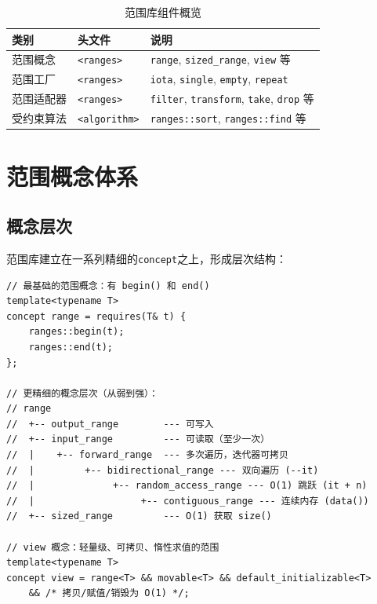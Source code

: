 \documentclass[12pt,a4paper,fontset=fandol]{ctexbook}
\newcommand{\header}[1]{\texttt{<#1>}}
\begin{document}
\begin{table}[htbp]
\centering
\caption{范围库组件概览}
\begin{tabularx}{\textwidth}{l l >{\raggedright\arraybackslash}X}
\toprule
\textbf{类别} & \textbf{头文件} & \textbf{说明} \\
\midrule
范围概念   & \header{ranges}       & \texttt{range}, \texttt{sized\_range}, \texttt{view} 等 \\
范围工厂   & \header{ranges}       & \texttt{iota}, \texttt{single}, \texttt{empty}, \texttt{repeat} \\
范围适配器 & \header{ranges}       & \texttt{filter}, \texttt{transform}, \texttt{take}, \texttt{drop} 等 \\
受约束算法 & \header{algorithm}    & \texttt{ranges::sort}, \texttt{ranges::find} 等 \\
\bottomrule
\end{tabularx}
\end{table}

\chapter{范围概念体系}

\section{概念层次}

范围库建立在一系列精细的\texttt{concept}之上，形成层次结构：

\begin{lstlisting}
// 最基础的范围概念：有 begin() 和 end()
template<typename T>
concept range = requires(T& t) {
    ranges::begin(t);
    ranges::end(t);
};

// 更精细的概念层次（从弱到强）：
// range
//  +-- output_range        --- 可写入
//  +-- input_range         --- 可读取（至少一次）
//  |    +-- forward_range  --- 多次遍历，迭代器可拷贝
//  |         +-- bidirectional_range --- 双向遍历 (--it)
//  |              +-- random_access_range --- O(1) 跳跃 (it + n)
//  |                   +-- contiguous_range --- 连续内存 (data())
//  +-- sized_range         --- O(1) 获取 size()

// view 概念：轻量级、可拷贝、惰性求值的范围
template<typename T>
concept view = range<T> && movable<T> && default_initializable<T>
    && /* 拷贝/赋值/销毁为 O(1) */;
\end{lstlisting}
\end{document}

